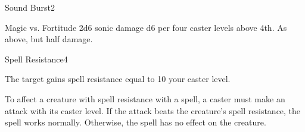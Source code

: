 \begin{spellsection}{Sound Burst}{2}
\begin{spellheader}
    \begin{spelltargetinginfo}
    \end{spelltargetinginfo}
\end{spellheader}
\begin{spellcontent}
    \begin{spelleffects}
        \begin{spellattack}{Magic vs. Fortitude}
            \spellsuccess 2d6 sonic damage \add d6 per four caster levels above 4th.
            \spellfailure As above, but half damage.
        \end{spellattack}
    \end{spelleffects}
\end{spellcontent}
\begin{spellfooter}
\end{spellfooter}
\end{spellsection}

\begin{spellsection}{Spell Resistance}{4}
\begin{spellheader}
    \begin{spelltargetinginfo}
    \end{spelltargetinginfo}
\end{spellheader}
\begin{spellcontent}
    \begin{spelleffects}
        \spelleffect The target gains spell resistance equal to 10 \add your caster level.
        \spelldur \durshort
    \end{spelleffects}
\end{spellcontent}
\begin{spellfooter}
    \spellnotes To affect a creature with spell resistance with a spell, a caster must make an attack with its caster level. If the attack beats the creature's spell resistance, the spell works normally. Otherwise, the spell has no effect on the creature.
\end{spellfooter}
\end{spellsection}

